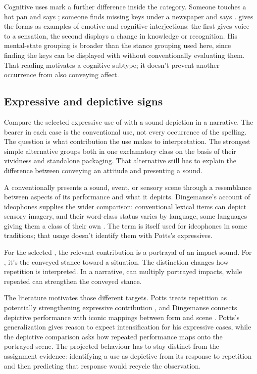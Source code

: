 \documentclass[12pt]{article}
\begin{document}
Cognitive uses mark a further difference inside the category. Someone
touches a hot pan and says ; someone finds missing keys
under a newspaper and says . \textcite[113]{ameka1992}
gives the forms as examples of emotive and cognitive interjections: the
first gives voice to a sensation, the second displays a change in
knowledge or recognition. His mental-state grouping is broader than the
stance grouping used here, since finding the keys can be displayed with
 without conventionally evaluating them. That reading
motivates a cognitive subtype; it doesn't prevent another occurrence from
also conveying affect.

\subsection{Expressive and depictive signs}\label{sec:expressive-depictive}

Compare the selected expressive use of  with a sound depiction
 in a narrative. The bearer in each case is the conventional
use, not every occurrence of the spelling. The question is what contribution
the use makes to interpretation. The strongest simple alternative groups
both in one exclamatory class on the basis of their vividness and
standalone packaging. That alternative still has to explain the difference
between conveying an attitude and presenting a sound.

A  conventionally presents a sound, event, or sensory
scene through a resemblance between aspects of its performance and what
it depicts. Dingemanse's account of ideophones supplies the wider comparison:
conventional lexical items can depict sensory imagery, and their word-class
status varies by language, some languages giving them a class of their own
\citep[2--3]{dingemanse2018}.
The term  is itself used for ideophones in some traditions;
that usage doesn't identify them with Potts's expressives.

For the selected , the relevant contribution is a portrayal
of an impact sound. For , it's the conveyed stance toward
a situation. The distinction changes how repetition is interpreted. In a
narrative,  can multiply portrayed impacts, while
repeated  can strengthen the conveyed stance.

The literature motivates those different targets. Potts treats repetition
as potentially strengthening expressive contribution \citep[167, 182]{potts2007},
and Dingemanse connects depictive performance with iconic mappings between
form and scene \citep[10--11]{dingemanse2018}. Potts's generalization
gives reason to expect intensification for his expressive cases, while the
depictive comparison asks how repeated performance maps onto the portrayed
scene. The projected behaviour has to stay distinct from the assignment
evidence: identifying a use as depictive from its response to repetition
and then predicting that response would recycle the observation.
\end{document}
